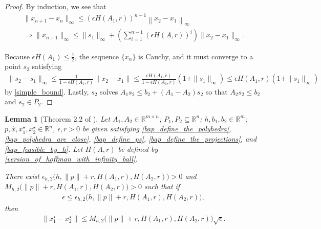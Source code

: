 \documentclass{article}
\newtheorem{lemma}[theorem]{Lemma}
\theoremstyle{case}
\numberwithin{theorem}{subsection}
\newcommand{\Rm}{\mathbb R^m}
\newcommand{\Rn}{\mathbb R^n}
\begin{document}
\begin{proof}
By induction, we see that
\begin{align*}
\|x_{n+1} - x_n\|_\infty 
\le \left(\epsilon H\left(A_1, r\right)\right)^{n-1}\left\|x_2 - x_1\right\|_\infty \\
\Longrightarrow \|x_{n+1}\|_\infty 
\le \|s_1\|_\infty + \left( \sum_{i=1}^{n-1}( \epsilon H(A, r))^i\right) \|x_2 - x_1\|_\infty .
\end{align*}

Because $\epsilon H(A_1)\le\frac 1 2$, the sequence $\{x_n\}$ is Cauchy, and it must converge to a point $s_2$ satisfying
\begin{align*}
\|s_2 - s_1\|_\infty 
\le \frac{1}{1 - \epsilon H\left(A_1, r\right)}\|x_2 - x_1\| 
\le \frac{\epsilon H\left(A_1, r\right)}{1 - \epsilon H\left(A_1, r\right)}\left(1 + \|s_1\|_{\infty}\right)
\le \epsilon H\left(A_1, r\right)\left(1 + \|s_1\|_{\infty}\right)
\end{align*}
by \cref{simple_bound}.
Lastly, $s_2$ solves $A_1s_2 \le b_2 + (A_1 - A_2)s_2$ so that $A_2s_2 \le b_2$ and $s_2 \in P_2$.
\end{proof}



\begin{lemma}[Theorem 2.2 of \cite{continuity_of_metric_projections}]
\label{2_2}
Let 
$A_1, A_2 \in \mathbb R ^ {m \times n}$; 
$P_1, P_2 \subseteq \Rn$; 
$h, b_1, b_2 \in \Rm$; 
$p, \hat x,x_1^{\star}, x_2^{\star}  \in \Rn$, 
$\epsilon, r > 0$
be given satisfying
\cref{bap_define_the_polyhedra}, \cref{bap_polyhedra_are_close}, \cref{bap_define_ps}, \cref{bap_define_the_projections}, and \cref{bap_feasible_by_h}.
Let $H\left(A, r\right)$ be defined by \cref{version_of_hoffman_with_infinity_ball}.

There exist
$\epsilon_{h, 2}\big(h, \|p\| + r, H\left(A_1, r\right), H\left(A_2, r\right)\big) > 0$ and 
$M_{h, 2} \big(\|p\| + r, H\left(A_1, r\right), H\left(A_2, r\right) \big) > 0$
such that if 
\begin{align*}
\epsilon \le \epsilon_{h, 2}\big(h, \|p\| + r, H\left(A_1, r\right), H\left(A_2, r\right)\big),
\end{align*}
then
\begin{align*}
\|x_1^{\star} - x_2^{\star}\| 
\le M_{h, 2} \big(\|p\| + r, H\left(A_1, r\right), H\left(A_2, r\right) \big) \sqrt{\epsilon}.
\end{align*}
\end{lemma}
\end{document}

